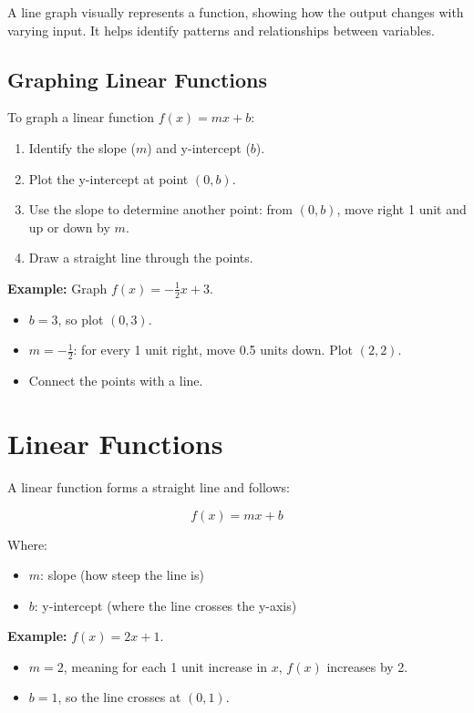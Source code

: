 A line graph visually represents a function, showing how the output changes with varying input. It helps identify patterns and relationships between variables.

\subsection{Graphing Linear Functions}

To graph a linear function \( f(x) = mx + b \):

\begin{enumerate}
    \item Identify the slope (\( m \)) and y-intercept (\( b \)).
    \item Plot the y-intercept at point \((0, b)\).
    \item Use the slope to determine another point: from \((0, b)\), move right 1 unit and up or down by \( m \).
    \item Draw a straight line through the points.
\end{enumerate}

\textbf{Example:} Graph \( f(x) = -\frac{1}{2}x + 3 \).

\begin{itemize}
    \item \( b = 3 \), so plot \((0, 3)\).
    \item \( m = -\frac{1}{2} \): for every 1 unit right, move 0.5 units down. Plot \((2, 2)\).
    \item Connect the points with a line.
\end{itemize}

\section{Linear Functions}

A linear function forms a straight line and follows:

\[
f(x) = mx + b
\]

Where:
\begin{itemize}
    \item \( m \): slope (how steep the line is)
    \item \( b \): y-intercept (where the line crosses the y-axis)
\end{itemize}

\textbf{Example:} \( f(x) = 2x + 1 \).

\begin{itemize}
    \item \( m = 2 \), meaning for each 1 unit increase in \( x \), \( f(x) \) increases by 2.
    \item \( b = 1 \), so the line crosses at \((0, 1)\).
\end{itemize}

